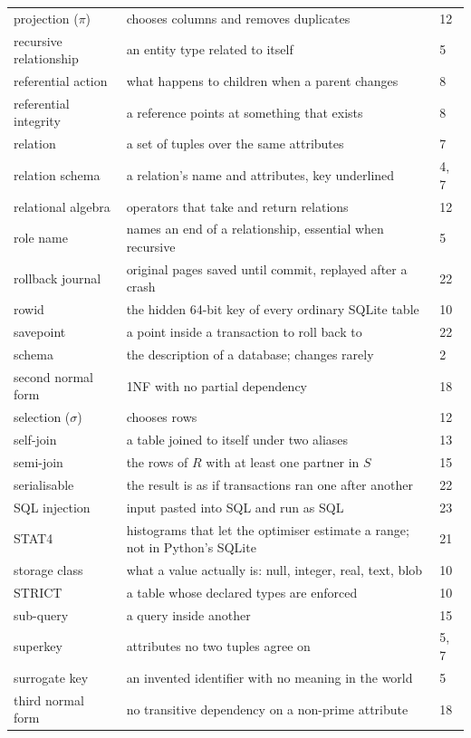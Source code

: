 \begin{longtable}{@{}L{3.9cm}L{8.9cm}R{1.2cm}@{}}
projection ($\pi$) & chooses columns and removes duplicates & 12 \\
recursive relationship & an entity type related to itself & 5 \\
referential action & what happens to children when a parent changes & 8 \\
referential integrity & a reference points at something that exists & 8 \\
relation & a set of tuples over the same attributes & 7 \\
relation schema & a relation's name and attributes, key underlined & 4, 7 \\
relational algebra & operators that take and return relations & 12 \\
role name & names an end of a relationship, essential when recursive & 5 \\
rollback journal & original pages saved until commit, replayed after a crash &
  22 \\
rowid & the hidden 64-bit key of every ordinary SQLite table & 10 \\
savepoint & a point inside a transaction to roll back to & 22 \\
schema & the description of a database; changes rarely & 2 \\
second normal form & 1NF with no partial dependency & 18 \\
selection ($\sigma$) & chooses rows & 12 \\
self-join & a table joined to itself under two aliases & 13 \\
semi-join & the rows of $R$ with at least one partner in $S$ & 15 \\
serialisable & the result is as if transactions ran one after another & 22 \\
SQL injection & input pasted into SQL and run as SQL & 23 \\
STAT4 & histograms that let the optimiser estimate a range; not in Python's
  SQLite & 21 \\
storage class & what a value actually is: null, integer, real, text, blob &
  10 \\
STRICT & a table whose declared types are enforced & 10 \\
sub-query & a query inside another & 15 \\
superkey & attributes no two tuples agree on & 5, 7 \\
surrogate key & an invented identifier with no meaning in the world & 5 \\
third normal form & no transitive dependency on a non-prime attribute & 18 \\

\end{longtable}
